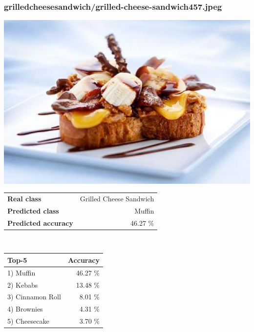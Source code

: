 \subsubsection{grilled\textunderscore cheese\textunderscore sandwich/grilled-cheese-sandwich457.jpeg}

\begin{minipage}[t]{0.4\textwidth}
	\vspace{0pt}
	\includegraphics[width=\linewidth]{images/evaluation-images/grilled_cheese_sandwich/grilled-cheese-sandwich457.jpeg}
\end{minipage}
\hfill
\begin{minipage}[t]{0.5\textwidth}
	\vspace{0pt}\raggedright
	\begin{tabularx}{\textwidth}{X r}
		\small \textbf{Real class} & \small Grilled Cheese Sandwich\\
		\small \textbf{Predicted class} & \small Muffin\\
		\small \textbf{Predicted accuracy} & \small 46.27 \%
    \end{tabularx}\\
    
    \vspace{6pt}
	\begin{tabularx}{\textwidth}{X r}
        \small \textbf{Top-5} & \small \textbf{Accuracy} \\
        \hline
		\small 1) Muffin & \small 46.27 \%\\\small 2) Kebabs & \small 13.48 \%\\\small 3) Cinnamon Roll & \small 8.01 \%\\\small 4) Brownies & \small 4.31 \%\\\small 5) Cheesecake & \small 3.70 \%
    \end{tabularx}
\end{minipage}
    
